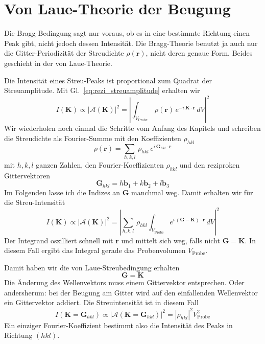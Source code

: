  
\section{Von Laue-Theorie der Beugung} 
 
Die Bragg-Bedingung sagt nur voraus, ob es in eine bestimmte Richtung einen Peak gibt, nicht jedoch dessen Intensität. Die Bragg-Theorie benutzt ja auch nur die Gitter-Periodizität der Streudichte $\rho( \mathbf{r})$, nicht deren genaue Form. Beides geschieht in der von Laue-Theorie.

Die Intensität eines Streu-Peaks ist proportional zum Quadrat der Streuamplitude. Mit Gl.~\ref{eq:rezi_streuamplitude} erhalten wir
\begin{equation}
I(\mathbf{K}) \propto \left| \mathcal{A}(\mathbf{K}) \right|^2 
= \left|   \int_{V_\text{Probe}} \, \rho( \mathbf{r}) \,   e^{- i \,   \mathbf{K} \cdot \mathbf{r}} \, dV \right|^2
\end{equation}
Wir wiederholen noch einmal die Schritte vom Anfang des Kapitels und schreiben die Streudichte als Fourier-Summe mit den Koeffizienten $\rho_{hkl}$
\begin{equation}
  \rho(\mathbf{r}) = \sum_{h,k,l} \, \rho_{hkl} \, e^{i \, \mathbf{G}_{hkl} \cdot \mathbf{r}}
\end{equation}
mit $h,k,l$ ganzen Zahlen, den Fourier-Koeffizienten $\rho_{hkl}$ und den  reziproken Gittervektoren
\begin{equation}
\mathbf{G}_{hkl} = h \mathbf{b}_1 + k \mathbf{b}_2 + l \mathbf{b}_3 
\end{equation}
Im Folgenden lasse ich die Indizes an $\mathbf{G}$ manchmal weg. Damit erhalten wir für die Streu-Intensität 
\begin{equation}
I(\mathbf{K}) \propto \left| \mathcal{A}(\mathbf{K}) \right|^2 
= \left| 
 \sum_{h,k,l} \, \rho_{hkl}
  \int_{V_\text{Probe}}   e^{ i \,   (\mathbf{G}- \mathbf{K} )\cdot \mathbf{r}} \, dV \right|^2
\end{equation}
Der Integrand oszilliert schnell mit $\mathbf{r}$ und mittelt sich weg, falls nicht $\mathbf{G} =  \mathbf{K}$. In diesem Fall ergibt das Integral gerade das Probenvolumen $V_\text{Probe}$.

Damit haben wir die von Laue-Streubedingung erhalten
\begin{equation}
\mathbf{G} =  \mathbf{K}
\end{equation}
Die Änderung des Wellenvektors muss einem Gittervektor entsprechen. Oder andersherum: bei der Beugung am Gitter wird auf den einfallenden Wellenvektor ein Gittervektor addiert.  Die Streuintensität ist in diesem Fall
\begin{equation}
I(\mathbf{K} = \mathbf{G}_{hkl} ) \propto \left| \mathcal{A}(\mathbf{K} = \mathbf{G}_{hkl} ) \right|^2 
= \left| \rho_{hkl} \right|^2   V_\text{Probe}^2 \label{eq:rezi_laue_peak}
\end{equation}
Ein einziger Fourier-Koeffizient bestimmt also die Intensität des Peaks in Richtung $(hkl)$.


